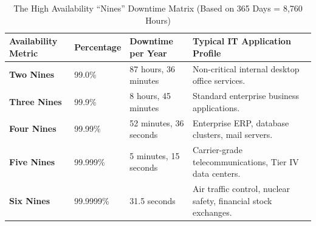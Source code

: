 \begin{table}[H]
\centering
\small
{}
\begin{tabularx}{\linewidth}{l l l l}
\toprule
\rowcolor{tableheadercolor}
\textbf{Availability Metric} & \textbf{Percentage} & \textbf{Downtime per Year} & \textbf{Typical IT Application Profile} \\
\midrule
\textbf{Two Nines} & 99.0\% & 87 hours, 36 minutes & Non-critical internal desktop office services. \\
\textbf{Three Nines} & 99.9\% & 8 hours, 45 minutes & Standard enterprise business applications. \\
\textbf{Four Nines} & 99.99\% & 52 minutes, 36 seconds & Enterprise ERP, database clusters, mail servers. \\
\textbf{Five Nines} & 99.999\% & 5 minutes, 15 seconds & Carrier-grade telecommunications, Tier IV data centers. \\
\textbf{Six Nines} & 99.9999\% & 31.5 seconds & Air traffic control, nuclear safety, financial stock exchanges. \\
\bottomrule
\end{tabularx}
\caption{The High Availability ``Nines'' Downtime Matrix (Based on 365 Days = 8,760 Hours)}
\end{table}
